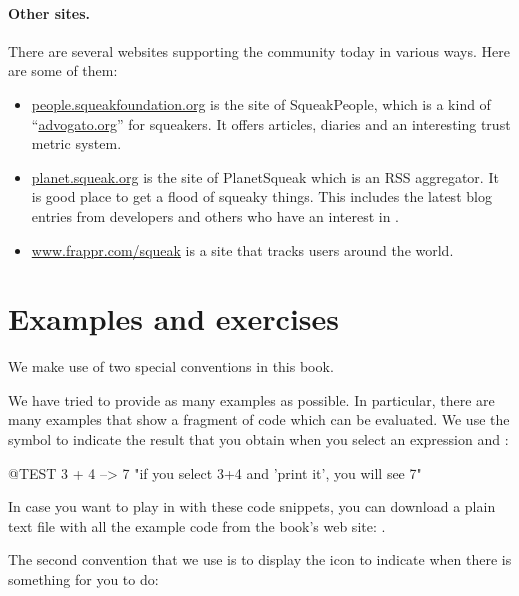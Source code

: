 \documentclass[a4paper,10pt,twoside]{book}
\begin{document}
\paragraph{Other sites.} There are several websites supporting the \squeak community today in various ways.
Here are some of them:
\begin{itemize}
  \item \url{people.squeakfoundation.org} is the site of SqueakPeople, which is a kind of ``\url{advogato.org}'' for squeakers. It offers articles, diaries and an interesting trust metric system.

  \item \url{planet.squeak.org} is the site of PlanetSqueak which is an RSS aggregator. It is good place to get a flood of squeaky things. This includes the latest blog entries from developers and others who have an interest in \squeak.

  \item \url{www.frappr.com/squeak} is a site that tracks \squeak users around the world.

\end{itemize}

\section*{Examples and exercises}

We make use of two special conventions in this book.

We have tried to provide as many examples as possible.
In particular, there are many examples that show a fragment of code which can be evaluated.  We use the symbol \ct{-->} to indicate the result that you obtain when you select an expression and :

\begin{code}{@TEST}
3 + 4 --> 7    "if you select 3+4 and 'print it', you will see 7"
\end{code}

In case you want to play in \squeak with these code snippets, you can download a plain text file with all the example code from the book's web site: \sbe.

The second convention that we use is to display the icon \dothisicon{} to indicate when there is something for you to do:


\end{document}
